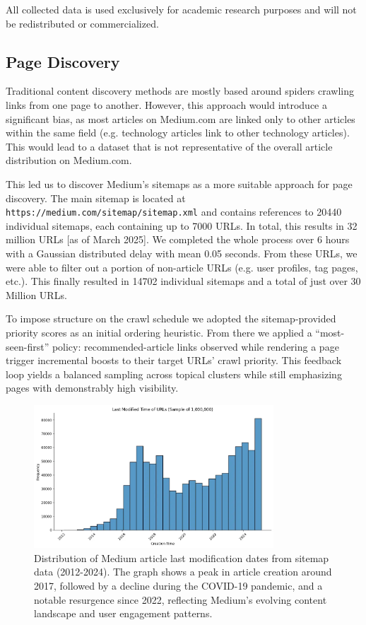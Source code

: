 \documentclass[11pt,a4paper]{article}
\newcommand{\code}[1]{\texttt{#1}}
\begin{document}
All collected data is used exclusively for academic research purposes and will not be redistributed or commercialized.

\subsection{Page Discovery}

Traditional content discovery methods are mostly based around spiders crawling links from one page to another. However, this approach would introduce a significant bias, as most articles on Medium.com are linked only to other articles within the same field (e.g. technology articles link to other technology articles). This would lead to a dataset that is not representative of the overall article distribution on Medium.com.

This led us to discover Medium's sitemaps as a more suitable approach for page discovery. The main sitemap is located at \code{https://medium.com/sitemap/sitemap.xml} and contains references to 20440 individual sitemaps, each containing up to 7000 URLs. In total, this results in 32 million URLs [as of March 2025]. We completed the whole process over 6 hours with a Gaussian distributed delay with mean 0.05 seconds. From these URLs, we were able to filter out a portion of non-article URLs (e.g. user profiles, tag pages, etc.).
This finally resulted in 14702 individual sitemaps and a total of just over 30 Million URLs.

To impose structure on the crawl schedule we adopted the sitemap-provided priority scores as an initial ordering heuristic. From there we applied a “most-seen-first” policy: recommended-article links observed while rendering a page trigger incremental boosts to their target URLs' crawl priority. This feedback loop yields a balanced sampling across topical clusters while still emphasizing pages with demonstrably high visibility.

\begin{figure}[H]
    \centering
    \includegraphics[width=0.8\textwidth]{images/Sitemaps_over_time.png}
    \caption{Distribution of Medium article last modification dates from sitemap data (2012-2024). The graph shows a peak in article creation around 2017, followed by a decline during the COVID-19 pandemic, and a notable resurgence since 2022, reflecting Medium's evolving content landscape and user engagement patterns.}
    \label{fig:sitemap_structure}
\end{figure}
\end{document}
